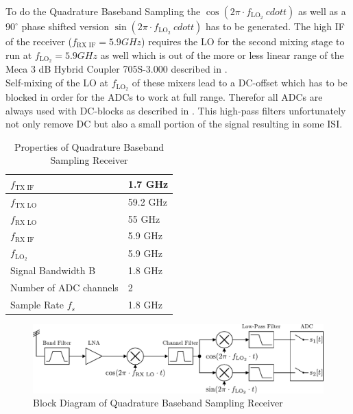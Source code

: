To do the Quadrature Baseband Sampling the
$\cos(2\pi \cdot f_{\text{LO}_2} \ cdot t)$ as well as a $90^\circ$
phase shifted version $\sin(2\pi \cdot f_{\text{LO}_2} \ cdot t)$ has to be
generated.
The high \gls{IF} of the receiver ($f_{\text{RX IF}} = 5.9 GHz$) requires
the \gls{LO} for the second mixing stage to run at $f_{\text{LO}_2} = 5.9 GHz$
as well which is out of the more or less linear range of the
Meca 3 dB Hybrid Coupler 705S-3.000 described in . \\

Self-mixing of the \gls{LO} at $f_{\text{LO}_2}$ of these mixers lead
to a \acrshort{DC}-offset which has to be blocked in order for the
\glspl{ADC} to work at full range.
Therefor all \glspl{ADC} are always used with \acrshort{DC}-blocks as described
in . This high-pass filters unfortunately
not only remove \acrshort{DC} but also a small portion of the signal
resulting in some \gls{ISI}. \\

\begin{table}[h]
  \centering
  \begin{tabular}{|l|l|}
    \hline
    $f_{\text{TX IF}}$              & 1.7 GHz \\ \hline
    $f_{\text{TX LO}}$              & 59.2 GHz \\ \hline
    $f_{\text{RX LO}}$              & 55 GHz \\ \hline
    $f_{\text{RX IF}}$              & 5.9 GHz \\ \hline
    $f_{\text{LO}_2}$               & 5.9 GHz \\ \hline
    Signal Bandwidth B           & 1.8 GHz \\ \hline
    Number of \gls{ADC} channels & 2 \\ \hline
    Sample Rate $f_s$ & 1.8 GHz \\ \hline
  \end{tabular}
  \caption{Properties of Quadrature Baseband Sampling Receiver}
  \label{tab:rx_0}
\end{table}

\begin{figure}[h!]
  \centering
  \includegraphics[width=\textwidth]{figures/rx_0_bd}
  \caption{Block Diagram of Quadrature Baseband Sampling Receiver}
  \label{fig:rx_0_bd}
\end{figure}

